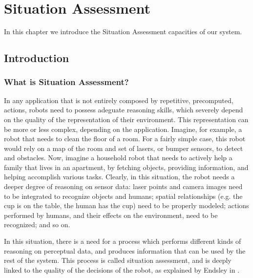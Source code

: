 
\chapter{Situation Assessment} %

\label{chap-situation_assessment} %


In this chapter we introduce the Situation Assessment capacities of our system. 

\section{Introduction}
\label{sec:situation_assessment-intro}
\subsection{What is Situation Assessment?}
In any application that is not entirely composed by repetitive, precomputed, actions, robots need to possess adeguate reasoning skills, which severely depend on the quality of the representation of their environment. This representation can be more or less complex, depending on the application. Imagine, for example, a robot that needs to clean the floor of a room. For a fairly simple case, this robot would rely on a map of the room and set of lasers, or bumper sensors, to detect and obstacles. Now, imagine a household robot that needs to actively help a family that lives in an apartment, by fetching objects, providing information, and helping accomplish various tasks. Clearly, in this situation, the robot needs a deeper degree of reasoning on sensor data: laser points and camera images need to be integrated to recognize objects and humans; spatial relationships  (e.g. the cup is on the table, the human has the cup) need to be properly modeled; actions performed by humans, and their effects on the environment, need to be recognized; and so on. 

In this situation, there is a need for a process which performs different kinds of reasoning on perceptual data, and produces information that can be used by the rest of the system. This process is called situation assessment, and is deeply linked to the quality of the decisions of the robot, as explained by Endsley in \cite{endsley1995toward}. 



